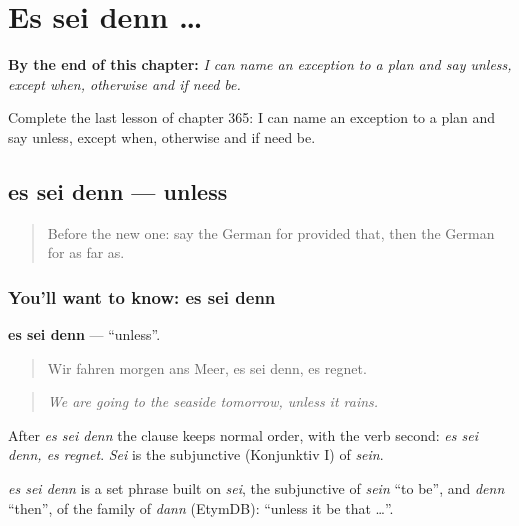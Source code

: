 
\chapter{Es sei denn …}
\label{ch:ge-es-sei-denn}

\begin{chapteropening}
\textbf{By the end of this chapter:} \emph{I can name an exception to a plan and say unless, except when, otherwise and if need be.}

Complete the last lesson of chapter 365: I can name an exception to a plan and say unless, except when, otherwise and if need be.
\end{chapteropening}

\section[es sei denn]{es sei denn — unless}

\label{lesson:GE-C365-es-sei-denn}



\begin{quote}
Before the new one: say the German for provided that, then the German for as far as.
\end{quote}

\subsection*{You'll want to know: es sei denn}
\textbf{es sei denn} — \textquotedblleft{}unless\textquotedblright{}.

\begin{quote}
Wir fahren morgen ans Meer, es sei denn, es regnet.
\end{quote}

\begin{quote}
\emph{We are going to the seaside tomorrow, unless it rains.}
\end{quote}

After \emph{es sei denn} the clause keeps normal order, with the verb second: \emph{es sei denn, es regnet}. \emph{Sei} is the subjunctive (Konjunktiv I) of \emph{sein}.

\begin{cousinweb}
\emph{es sei denn} is a set phrase built on \emph{sei}, the subjunctive of \emph{sein} \textquotedblleft{}to be\textquotedblright{}, and \emph{denn} \textquotedblleft{}then\textquotedblright{}, of the family of \emph{dann} (EtymDB): \textquotedblleft{}unless it be that …\textquotedblright{}.
\end{cousinweb}

